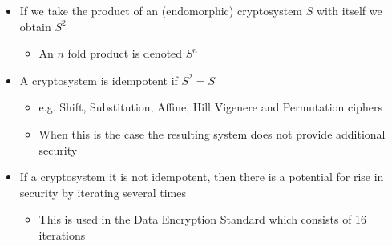 \begin{itemize}
  \item If we take the product of an (endomorphic) cryptosystem $S$ with itself we obtain $S^2$
  \begin{itemize}
  	\item An $n$ fold product is denoted $S^n$
  \end{itemize}
  \item A cryptosystem is idempotent if $S^2 = S$
  \begin{itemize}
  	\item e.g. Shift, Substitution, Affine, Hill Vigenere and Permutation ciphers
  	\item When this is the case the resulting system does not provide additional security
  \end{itemize}
  \item If a cryptosystem it is not idempotent, then there is a potential for rise in security by iterating several times
  \begin{itemize}
  	\item This is used in the Data Encryption Standard which consists of 16 iterations
  \end{itemize}

\end{itemize}

\newpage 

